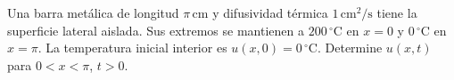 Una barra metálica de longitud $\pi\,\mathrm{cm}$ y difusividad térmica $1\,\mathrm{cm^2/s}$ tiene la superficie lateral aislada. Sus extremos se mantienen a $200\,{}^\circ\mathrm C$ en $x=0$ y $0\,{}^\circ\mathrm C$ en $x=\pi$. La temperatura inicial interior es $u(x,0)=0\,{}^\circ\mathrm C$. Determine $u(x,t)$ para $0<x<\pi$, $t>0$.
